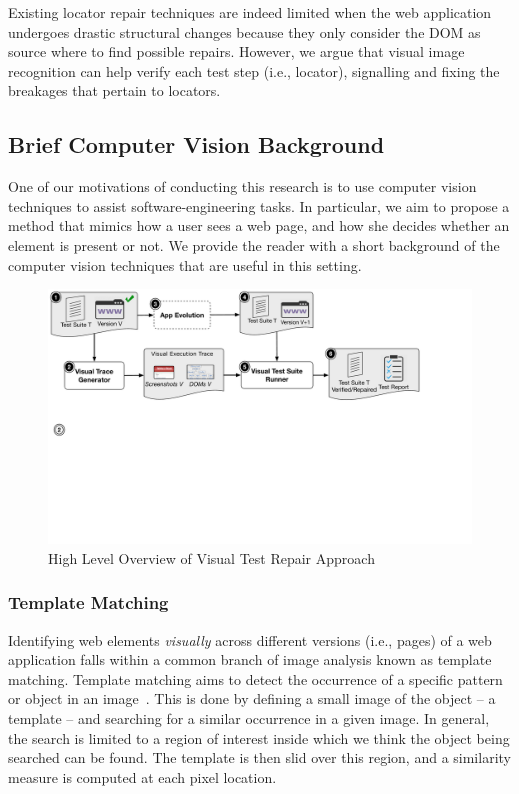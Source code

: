 Existing locator repair techniques are indeed limited when the web application undergoes drastic structural changes because they only consider the DOM as source where to find possible repairs.
However, we argue that visual image recognition can help verify each test step (i.e., locator), signalling and fixing the breakages that pertain to locators.

\subsection{Brief Computer Vision Background}

One of our motivations of conducting this research is to use computer vision techniques to assist software-engineering tasks. In particular, we aim to propose a method that mimics how a user sees a web page, and how she decides whether an element is present or not. We provide the reader with a short background of the computer vision techniques that are useful in this setting.

\begin{figure}[t]
\centering
\includegraphics[trim={0.2cm 13cm 5cm 0.2cm},clip,scale=0.24]{images/approach2}
\caption{High Level Overview of Visual Test Repair Approach}
\label{approach}
\end{figure}

\subsubsection{Template Matching}

Identifying web elements \textit{visually} across different versions (i.e., pages) of a web application falls within a common branch of image analysis known as template matching. 
%
Template matching aims to detect the occurrence of a specific pattern or object in an image~\cite{Brunelli:2009:TMT:1643435}. This is done by defining a small image of the object -- a template -- and searching for a similar occurrence in a given image. In general, the search is limited to a region of interest inside which we think the object being searched can be found. The template is then slid over this region, and a similarity measure is computed at each pixel location.

